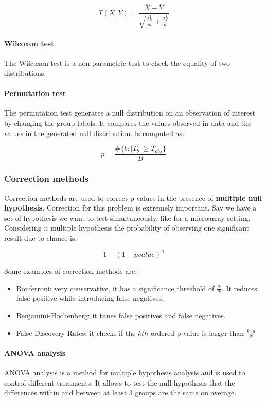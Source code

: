 			$$T(X, Y) = \frac{\bar{X}-\bar{Y}}{\sqrt{\frac{\sigma^2_{X}}{m}+\frac{\sigma^2_Y}{n}}}$$

			\paragraph{Wilcoxon test}
			The Wilcoxon test is a non parametric test to check the equality of two distributions.

			\paragraph{Permutation test}
			The permutation test generates a null distribution on an observation of interest by changing the group labels.
			It compares the values observed in data and the values in the generated null distribution.
			Is computed as:

			$$p = \frac{\#\{b:|T_b|\ge T_{obs}\}}{B}$$

		\subsubsection{Correction methods}
		Correction methods are used to correct p-values in the presence of \textbf{multiple null hypothesis}.
		Correction for this problem is extremely important.
		Say we have a set of hypothesis we want to test simultaneously, like for a microarray setting.
		Considering $n$ multiple hypothesis the probability of observing one significant result due to chance is:

		$$1-(1-pvalue)^n$$

		Some examples of correction methods are:

		\begin{multicols}{2}
			\begin{itemize}
				\item Bonferroni: very conservative, it has a significance threshold of $\frac{\alpha}{N}$.
					It reduces false positive while introducing false negatives.
				\item Benjamini-Hochenberg: it tunes false positives and false negatives.
				\item False Discovery Rates: it checks if the $kth$ ordered p-value is larger than $\frac{k\cdot a}{N}$
			\end{itemize}
		\end{multicols}

		\paragraph{ANOVA analysis}
			ANOVA analysis is a method for multiple hypothesis analysis and is used to control different treatments.
			It allows to test the null hypothesis that the differences within and between at least $3$ groups are the same on average.

